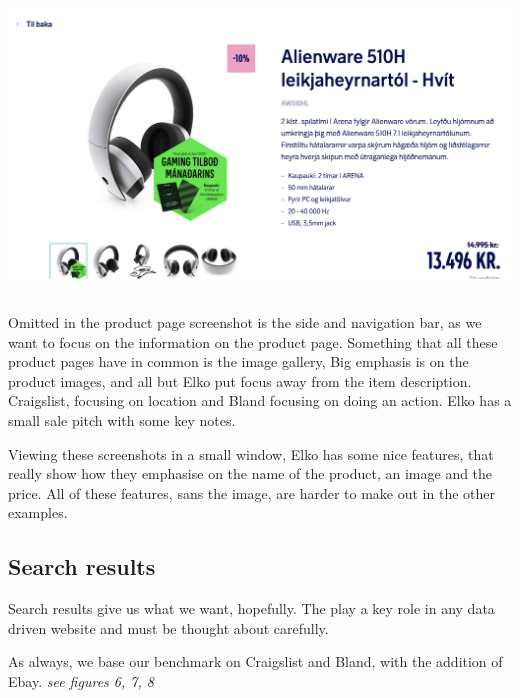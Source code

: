 \begin{Figure}
    \begin{center}
        \includegraphics[width=150mm, height=80mm]{Images/benchmarking/product_page_elko.png}
    \end{center}
\end{Figure}
Omitted in the product page screenshot is the side and navigation bar, as we want to focus on the information on the product page.
Something that all these product pages have in common is the image gallery, Big emphasis is on the product images, and all but Elko put focus away from the item description. Craigslist, focusing on location and Bland focusing on doing an action. Elko has a small sale pitch with some key notes.

Viewing these screenshots in a small window, Elko has some nice features, that really show how they emphasise on the name of the product, an image and the price. All of these features, sans the image, are harder to make out in the other examples.

\subsection{Search results}
Search results give us what we want, hopefully. The play a key role in any data driven website and must be thought about carefully. 

As always, we base our benchmark on Craigslist and Bland, with the addition of Ebay. \textit{see figures 6, 7, 8}

